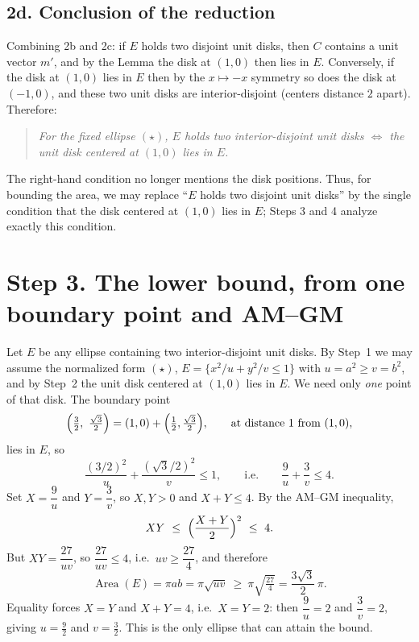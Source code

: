 \documentclass[11pt]{article}
\DeclareMathOperator{\Area}{Area}
\begin{document}
\subsection*{2d. Conclusion of the reduction}

Combining 2b and 2c: if $E$ holds two disjoint unit disks, then $C$ contains a unit vector
$m'$, and by the Lemma the disk at $(1,0)$ then lies in $E$. Conversely, if the disk at
$(1,0)$ lies in $E$ then by the $x\mapsto-x$ symmetry so does the disk at $(-1,0)$, and these
two unit disks are interior-disjoint (centers distance $2$ apart). Therefore:
\begin{quote}
\itshape
For the fixed ellipse $(\star)$, $E$ holds two interior-disjoint unit disks
$\iff$ the unit disk centered at $(1,0)$ lies in $E$.
\end{quote}
The right-hand condition no longer mentions the disk positions. Thus, for bounding the area, we may
replace ``$E$ holds two disjoint unit disks'' by the single condition that the disk centered at
$(1,0)$ lies in $E$; Steps 3 and 4 analyze exactly this condition.

\section*{Step 3. The lower bound, from one boundary point and AM--GM}

Let $E$ be any ellipse containing two interior-disjoint unit disks. By Step~1 we may assume the
normalized form $(\star)$, $E=\{x^2/u+y^2/v\le1\}$ with $u=a^2\ge v=b^2$, and by Step~2 the unit disk
centered at $(1,0)$ lies in $E$. We need only \emph{one} point of that disk. The boundary point
\[
  \Bigl(\tfrac32,\ \tfrac{\sqrt3}{2}\Bigr)=(1,0)+\Bigl(\tfrac12,\tfrac{\sqrt3}{2}\Bigr),
  \qquad\text{at distance }1\text{ from }(1,0),
\]
lies in $E$, so
\[
  \frac{(3/2)^2}{u}+\frac{(\sqrt3/2)^2}{v}\le1,
  \qquad\text{i.e.}\qquad \frac{9}{u}+\frac{3}{v}\le4 .
\]
Set $X=\dfrac9u$ and $Y=\dfrac3v$, so $X,Y>0$ and $X+Y\le4$. By the AM--GM inequality,
\[
  XY\ \le\ \Bigl(\frac{X+Y}{2}\Bigr)^2\ \le\ 4 .
\]
But $XY=\dfrac{27}{uv}$, so $\dfrac{27}{uv}\le4$, i.e.\ $uv\ge\dfrac{27}{4}$, and therefore
\[
  \Area(E)=\pi ab=\pi\sqrt{uv}\ \ge\ \pi\sqrt{\tfrac{27}{4}}=\frac{3\sqrt3}{2}\,\pi .
\]
Equality forces $X=Y$ and $X+Y=4$, i.e.\ $X=Y=2$: then $\dfrac9u=2$ and $\dfrac3v=2$, giving
$u=\tfrac92$ and $v=\tfrac32$. This is the only ellipse that can attain the bound.

\end{document}

